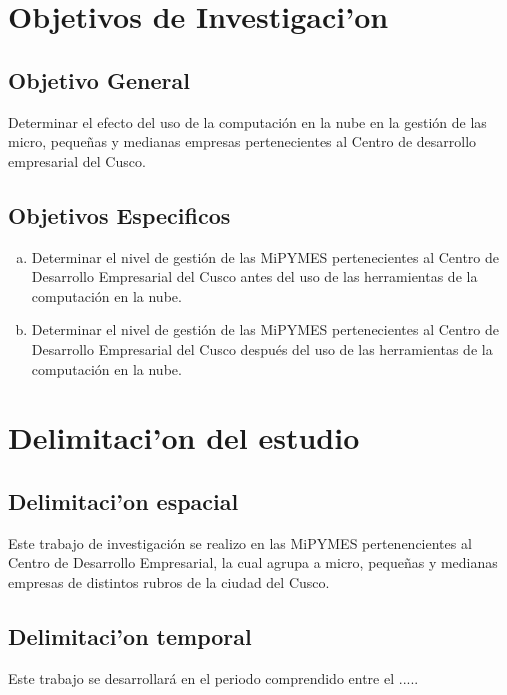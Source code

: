 
\section{Objetivos de Investigaci'on}
\subsection{Objetivo General}
Determinar el efecto del uso de la computaci\'on en la nube en la gesti\'on de
las micro, peque\~nas y medianas empresas pertenecientes al Centro de desarrollo
empresarial del Cusco.
\subsection{Objetivos Especificos}
\begin{enumerate}[a.]
\item Determinar el nivel de gesti\'on de las MiPYMES pertenecientes al Centro de
Desarrollo Empresarial del Cusco antes del uso de las herramientas de la
computaci\'on en la nube.
\item Determinar el nivel de gesti\'on de las MiPYMES pertenecientes al Centro de
Desarrollo Empresarial del Cusco despu\'es del uso de las herramientas de la
computaci\'on en la nube.
\end{enumerate}
\section{Delimitaci'on del estudio}
\subsection{Delimitaci'on espacial}
Este trabajo de investigaci\'on se realizo en las MiPYMES pertenencientes al
Centro de Desarrollo Empresarial, la cual agrupa a micro, peque\~nas y
medianas empresas de distintos rubros de la ciudad del Cusco.

\subsection{Delimitaci'on temporal}
Este trabajo se desarrollar\'a en el periodo comprendido entre el .....
